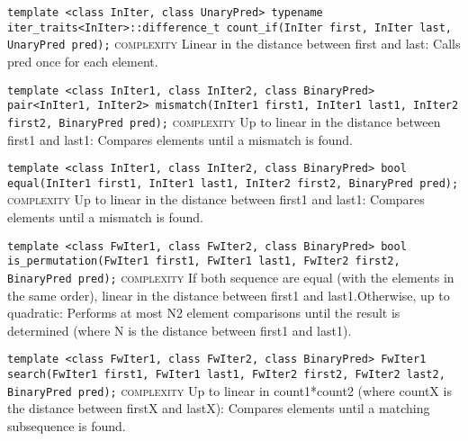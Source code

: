 \noindent{}\hspace*{0.25em}\lstinline[basicstyle=\ttfamily\color{corange}]{template <class InIter, class UnaryPred> typename iter_traits<InIter>::difference_t count_if(InIter first, InIter last, UnaryPred pred);} \textsc{complexity} Linear in the distance between first and last: Calls pred once for each element.\\\vspace{-0.6em}

\noindent{}\hspace*{0.25em}\lstinline[basicstyle=\ttfamily\color{corange}]{template <class InIter1, class InIter2, class BinaryPred> pair<InIter1, InIter2> mismatch(InIter1 first1, InIter1 last1, InIter2 first2, BinaryPred pred);} \textsc{complexity} Up to linear in the distance between first1 and last1: Compares elements until a mismatch is found.\\\vspace{-0.6em}

\noindent{}\hspace*{0.25em}\lstinline[basicstyle=\ttfamily\color{corange}]{template <class InIter1, class InIter2, class BinaryPred> bool equal(InIter1 first1, InIter1 last1, InIter2 first2, BinaryPred pred);} \textsc{complexity} Up to linear in the distance between first1 and last1: Compares elements until a mismatch is found.\\\vspace{-0.6em}

\noindent{}\hspace*{0.25em}\lstinline[basicstyle=\ttfamily\color{corange}]{template <class FwIter1, class FwIter2, class BinaryPred> bool is_permutation(FwIter1 first1, FwIter1 last1, FwIter2 first2, BinaryPred pred);} \textsc{complexity} If both sequence are equal (with the elements in the same order), linear in the distance between first1 and last1.Otherwise, up to quadratic: Performs at most N2 element comparisons until the result is determined (where N is the distance between first1 and last1).\\\vspace{-0.6em}

\noindent{}\hspace*{0.25em}\lstinline[basicstyle=\ttfamily\color{corange}]{template <class FwIter1, class FwIter2, class BinaryPred> FwIter1 search(FwIter1 first1, FwIter1 last1, FwIter2 first2, FwIter2 last2, BinaryPred pred);} \textsc{complexity} Up to linear in count1*count2 (where countX is the distance between firstX and lastX): Compares elements until a matching subsequence is found.\\\vspace{-0.6em}

